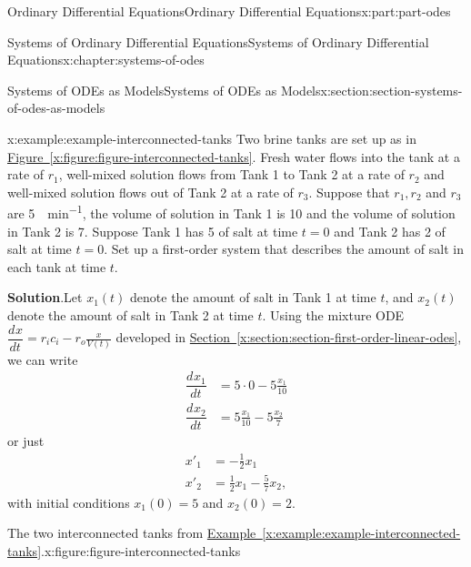 \documentclass[twoside,10pt,]{book}
\newcommand{\blocktitlefont}{\relax}
\newcommand{\xreffont}{\relax}
\numberwithin{equation}{part}
\providecommand{\dv}[3][]{\dfrac{d^{#1} #2}{d #3^{#1}}}
\newcommand{\amp}{&}
\begin{document}
\begin{partptx}{Ordinary Differential Equations}{}{Ordinary Differential Equations}{}{}{x:part:part-odes}
\begin{chapterptx}{Systems of Ordinary Differential Equations}{}{Systems of Ordinary Differential Equations}{}{}{x:chapter:systems-of-odes}
\begin{sectionptx}{Systems of ODEs as Models}{}{Systems of ODEs as Models}{}{}{x:section:section-systems-of-odes-as-models}
\begin{example}{}{x:example:example-interconnected-tanks}
Two brine tanks are set up as in \hyperref[x:figure:figure-interconnected-tanks]{Figure~{\xreffont\ref{x:figure:figure-interconnected-tanks}}}. Fresh water flows into the tank at a rate of \(r_{1}\), well-mixed solution flows from Tank 1 to Tank 2 at a rate of \(r_{2}\) and well-mixed solution flows out of Tank 2 at a rate of \(r_{3}\). Suppose that \(r_{1}, r_{2}\) and  \(r_{3}\) are \SI{5}{\gallon\per\minute}, the volume of solution in Tank 1 is \SI{10}{\gallon} and the volume of solution in Tank 2 is \SI{7}{\gallon}. Suppose Tank 1 has \SI{5}{\pound} of salt at time \(t=0\) and Tank 2 has \SI{2}{\pound} of salt at time \(t=0\). Set up a first-order system that describes the amount of salt in each tank at time \(t\).%
\par\smallskip%
\noindent\textbf{\blocktitlefont Solution}.\hypertarget{g:solution:idp105548815951392}{}\quad{}Let \(x_{1}(t)\) denote the amount of salt in Tank 1 at time \(t\), and \(x_{2}(t)\) denote the amount of salt in Tank 2 at time \(t\). Using the mixture ODE \(\dv{x}{t} = r_{i}c_{i}-r_{o}\frac{x}{V(t)}\) developed in \hyperref[x:section:section-first-order-linear-odes]{Section~{\xreffont\ref{x:section:section-first-order-linear-odes}}}, we can write%
\begin{align*}
\dv{x_{1}}{t} \amp= 5\cdot0 - 5\frac{x_{1}}{10}\\
\dv{x_{2}}{t} \amp= 5\frac{x_{1}}{10}-5\frac{x_{2}}{7}
\end{align*}
or just%
\begin{align*}
x'_{1}  \amp=  -\frac{1}{2}x_{1}\\
x'_{2}  \amp=  \frac{1}{2}x_{1}-\frac{5}{7}x_{2},
\end{align*}
with initial conditions \(x_{1}(0) = 5\) and \(x_{2}(0) = 2\).%
\end{example}
\begin{figureptx}{The two interconnected tanks from \hyperref[x:example:example-interconnected-tanks]{Example~{\xreffont\ref{x:example:example-interconnected-tanks}}}.}{x:figure:figure-interconnected-tanks}{}%
\begin{image}{0}{1}{0}%
\end{image}
\end{figureptx}
\end{sectionptx}
\end{chapterptx}
\end{partptx}
\end{document}
